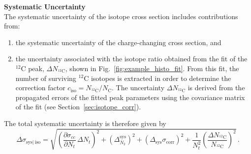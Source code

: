 \vskip 0.2in
\noindent\textbf{Systematic Uncertainty} \\
The systematic uncertainty of the isotope cross section includes contributions from:

\begin{enumerate}[label=(\alph*)]
    \item the systematic uncertainty of the charge-changing cross section, and
    \item the uncertainty associated with the isotope ratio obtained from the fit of the $^{12}\mathrm{C}$ peak, $\Delta N_{^{12}\mathrm{C}}$, shown in Fig.~\ref{fig:example_histo_fit}. From this fit, the number of surviving $^{12}\mathrm{C}$ isotopes is extracted in order to determine the correction factor $c_{\text{iso}} = N_{^{12}\mathrm{C}} / N_{\mathrm{C}}$. The uncertainty $\Delta N_{^{12}\mathrm{C}}$ is derived from the propagated errors of the fitted peak parameters using the covariance matrix of the fit (see Section~\ref{sec:isotope_corr}).
\end{enumerate}

The total systematic uncertainty is therefore given by
\begin{equation}
\Delta\sigma_{\text{sys}|\:\text{iso}} = \sqrt{
    \left( \frac{\partial \sigma_{cc}}{\partial N_t}\, \Delta N_t \right)^2
    + \left( \Delta^{\text{sys}}_{N_2} \right)^2
    + \left( \Delta_{\text{sys}} \sigma_{\text{corr}} \right)^2
    + \frac{1}{N_t^2} \left( \frac{\Delta N_{^{12}\mathrm{C}}}{N_{^{12}\mathrm{C}}} \right)^2 } \, .
\end{equation}

